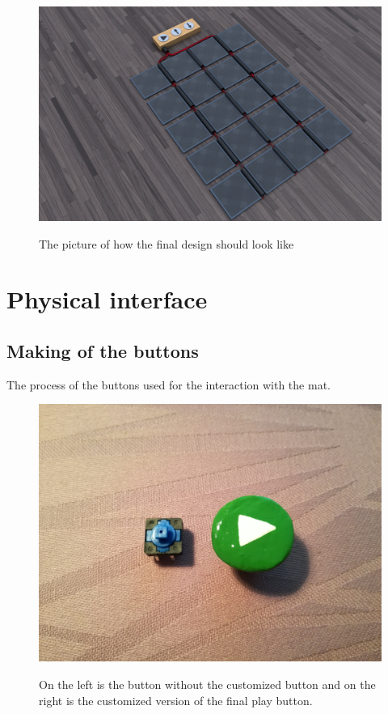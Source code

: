 \begin{figure}[H]
	\centering
	\includegraphics[width=0.7\linewidth]{figure/Design/finaldesign}
	\label{fig:finaldesign}
	\caption{The picture of how the final design should look like}
	
\end{figure}


\section{Physical interface}

\subsection{Making of the buttons}

The process of the buttons used for the interaction with the mat.

\begin{figure}[H]
	\centering
	\includegraphics[width=0.7\linewidth]{figure/Design/buttons}
	\label{fig:buttons}
	\caption{On the left is the button without the customized button and on the right is the customized version of the final play button.}
	
\end{figure}

